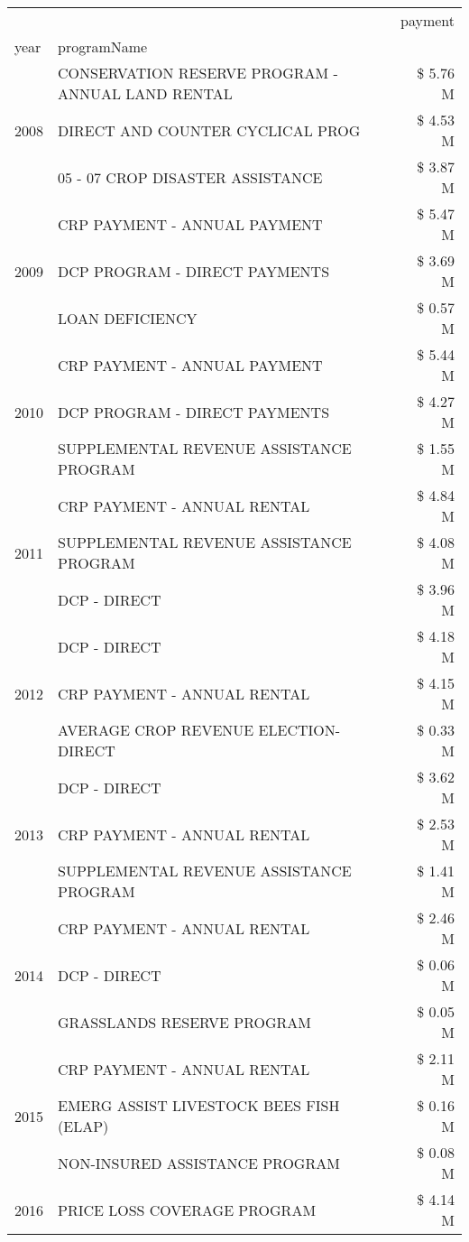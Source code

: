 \begin{tabular}{llr}
\toprule
 &  & payment \\
year & programName &  \\
\midrule
\multirow[t]{3}{*}{2008} & CONSERVATION RESERVE PROGRAM - ANNUAL LAND RENTAL & \$ 5.76 M \\
 & DIRECT AND COUNTER CYCLICAL PROG & \$ 4.53 M \\
 & 05 - 07 CROP DISASTER ASSISTANCE & \$ 3.87 M \\
\cline{1-3}
\multirow[t]{3}{*}{2009} & CRP PAYMENT - ANNUAL PAYMENT & \$ 5.47 M \\
 & DCP PROGRAM - DIRECT PAYMENTS & \$ 3.69 M \\
 & LOAN DEFICIENCY & \$ 0.57 M \\
\cline{1-3}
\multirow[t]{3}{*}{2010} & CRP PAYMENT - ANNUAL PAYMENT & \$ 5.44 M \\
 & DCP PROGRAM - DIRECT PAYMENTS & \$ 4.27 M \\
 & SUPPLEMENTAL REVENUE ASSISTANCE PROGRAM & \$ 1.55 M \\
\cline{1-3}
\multirow[t]{3}{*}{2011} & CRP PAYMENT - ANNUAL RENTAL & \$ 4.84 M \\
 & SUPPLEMENTAL REVENUE ASSISTANCE PROGRAM & \$ 4.08 M \\
 & DCP - DIRECT & \$ 3.96 M \\
\cline{1-3}
\multirow[t]{3}{*}{2012} & DCP - DIRECT & \$ 4.18 M \\
 & CRP PAYMENT - ANNUAL RENTAL & \$ 4.15 M \\
 & AVERAGE CROP REVENUE ELECTION-DIRECT & \$ 0.33 M \\
\cline{1-3}
\multirow[t]{3}{*}{2013} & DCP - DIRECT & \$ 3.62 M \\
 & CRP PAYMENT - ANNUAL RENTAL & \$ 2.53 M \\
 & SUPPLEMENTAL REVENUE ASSISTANCE PROGRAM & \$ 1.41 M \\
\cline{1-3}
\multirow[t]{3}{*}{2014} & CRP PAYMENT - ANNUAL RENTAL & \$ 2.46 M \\
 & DCP - DIRECT & \$ 0.06 M \\
 & GRASSLANDS RESERVE PROGRAM & \$ 0.05 M \\
\cline{1-3}
\multirow[t]{3}{*}{2015} & CRP PAYMENT - ANNUAL RENTAL & \$ 2.11 M \\
 & EMERG ASSIST LIVESTOCK BEES FISH (ELAP) & \$ 0.16 M \\
 & NON-INSURED ASSISTANCE PROGRAM & \$ 0.08 M \\
\cline{1-3}
\multirow[t]{3}{*}{2016} & PRICE LOSS COVERAGE PROGRAM & \$ 4.14 M \\

\end{tabular}
